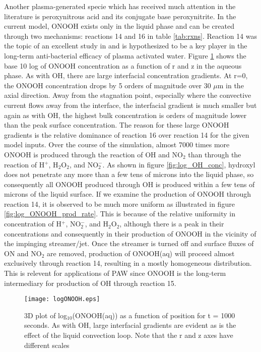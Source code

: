 \documentclass[12pt]{article}
\newcommand{\ONOOHlong}{14}
\newcommand{\OHfromONOOH}{15}
\newcommand{\ONOOHshort}{16}
\begin{document}
Another plasma-generated specie which has received much attention in the literature is peroxynitrous acid and its conjugate base peroxynitrite. In the current model, ONOOH exists only in the liquid phase and can be created through two mechanisms: reactions \ONOOHlong{} and \ONOOHshort{} in table \ref{tab:rxns}. Reaction \ONOOHlong{} was the topic of an excellent study in \cite{Lukes2014b} and is hypothesized to be a key player in the long-term anti-bacterial efficacy of plasma activated water. Figure \ref{fig:log_ONOOH_conc} shows the base 10 log of ONOOH concentration as a function of r and z in the aqueous phase. As with OH, there are large interfacial concentration gradients. At r=0, the ONOOH concentration drops by 5 orders of magnitude over 30 $\mu$m in the axial direction. Away from the stagnation point, especially where the convective current flows away from the interface, the interfacial gradient is much smaller but again as with OH, the highest bulk concentration is orders of magnitude lower than the peak surface concentration. The reason for these large ONOOH gradients is the relative dominance of reaction \ONOOHshort{} over reaction \ONOOHlong{} for the given model inputs. Over the course of the simulation, almost 7000 times more ONOOH is produced through the reaction of OH and NO$_2$ than through the reaction of H$^+$, H$_2$O$_2$, and NO$_2^-$. As shown in figure \ref{fig:log_OH_conc}, hydroxyl does not penetrate any more than a few tens of microns into the liquid phase, so consequently all ONOOH produced through OH is produced within a few tens of microns of the liquid surface. If we examine the production of ONOOH through reaction \ONOOHlong{}, it is observed to be much more uniform as illustrated in figure \ref{fig:log_ONOOH_prod_rate}. This is because of the relative uniformity in concentration of H$^+$, NO$_2^-$, and H$_2$O$_2$, although there is a peak in their concentrations and consequently in their production of ONOOH in the vicinity of the impinging streamer/jet. Once the streamer is turned off and surface fluxes of ON and NO$_2$ are removed, production of ONOOH(aq) will proceed almost exclusively through reaction \ONOOHlong{}, resulting in a mostly homogeneous distribution. This is relevent for applications of PAW since ONOOH is the long-term intermediary for production of OH through reaction \OHfromONOOH{}.

\begin{figure}[htb]
    \centering
    \texttt{[image: logONOOH.eps]}
    \caption{3D plot of log$_{10}$(ONOOH(aq)) as a function of position for t = 1000 seconds. As with OH, large interfacial gradients are evident as is the effect of the liquid convection loop. Note that the r and z axes have different scales}
    \label{fig:log_ONOOH_conc}
\end{figure}
\end{document}
